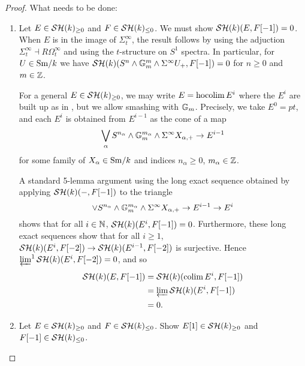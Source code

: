 \documentclass{amsart}%
\begin{document}
\begin{proof}
What needs to be done: 
\begin{enumerate}
    \item Let $E \in \mathcal{SH}(k)_{\geq 0}$ and $F \in \mathcal{SH}(k)_{\leq 0}$. We
  must show $\mathcal{SH}(k)(E,F[-1])=0$.  When $E$ is in the image of
  $\Sigma^{\infty}_t$, the result follows by using the adjuction
  $\Sigma^{\infty}_t \dashv R\Omega^{\infty}_t$ and using the
  $t$-structure on $S^1$ spectra. In particular, for $U \in \mathrm{Sm}/k$ we
  have
  $\mathcal{SH}(k)(S^n \wedge \mathbb{G}_m^m \wedge \Sigma^{\infty} U_+, F[-1])=0$
  for $n\geq 0$ and $m \in \mathbb{Z}$.

  For a general $E \in \mathcal{SH}(k)_{\geq 0}$, we may write
  $E = \operatorname{hocolim} E^i$ where the $E^i$ are built up as in
  \cite[3.3.4]{Mor05}, but we allow smashing with $\mathbb{G}_m$.
  Precisely, we take $E^0 = pt$, and each $E^i$ is obtained from
  $E^{i-1}$ as the cone of a map
  \begin{equation*}
    \bigvee_{\alpha}S^{n_{\alpha} }\wedge \mathbb{G}_m^{m_{\alpha}} \wedge \Sigma^{\infty} X_{\alpha, +} 
    \to E^{i-1}
  \end{equation*}
  for some family of $X_{\alpha} \in \mathrm{Sm}/k$ and indices
  $n_{\alpha}\geq 0$, $m_{\alpha}\in \mathbb{Z}$. 


  A standard 5-lemma argument using the long exact sequence obtained
  by applying $\mathcal{SH}(k)(-, F[-1])$ to the triangle
  \begin{equation*}
    \vee S^{n_{\alpha} }\wedge \mathbb{G}_m^{m_{\alpha}} \wedge \Sigma^{\infty} X_{\alpha, +} \to E^{i-1} \to E^i
  \end{equation*}
  shows that for all $i\in \mathbb{N}$, $\mathcal{SH}(k)(E^i,F[-1])=0$. Furthermore,
  these long exact sequences show that for all $i\geq 1$,
  $\mathcal{SH}(k)(E^{i},F[-2]) \to \mathcal{SH}(k)(E^{i-1}, F[-2])$ is
  surjective. Hence $\operatorname{\underleftarrow{\lim}}^{1} \mathcal{SH}(k)(E^{i}, F[-2]) = 0$, and
  so
  \begin{align*}
    \mathcal{SH}(k)(E, F[-1]) & = \mathcal{SH}(k)(\operatorname{colim} E^i, F[-1]) \\
                     & = \operatorname{\underleftarrow{\lim}} \mathcal{SH}(k)(E^i, F[-1]) \\
                     & = 0.
  \end{align*}

  
    \item Let $E \in \mathcal{SH}(k)_{\geq 0}$ and $F \in \mathcal{SH}(k)_{\leq 0}$.
  Show $E[1] \in \mathcal{SH}(k)_{\geq 0}$ and $F[-1] \in \mathcal{SH}(k)_{\leq 0}$.


\end{enumerate}
\end{proof}
\end{document}
